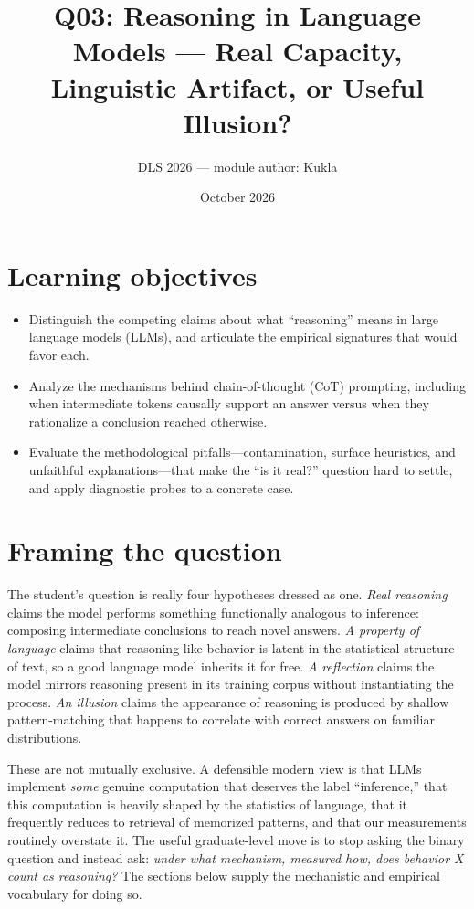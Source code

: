 \documentclass[11pt]{article}
\title{Q03: Reasoning in Language Models --- Real Capacity, Linguistic Artifact, or Useful Illusion?}
\author{DLS 2026 --- module author: Kukla}
\date{October 2026}
\begin{document}
\maketitle

\section*{Learning objectives}
\begin{itemize}[leftmargin=*]
  \item Distinguish the competing claims about what ``reasoning'' means in large language models (LLMs), and articulate the empirical signatures that would favor each.
  \item Analyze the mechanisms behind chain-of-thought (CoT) prompting, including when intermediate tokens causally support an answer versus when they rationalize a conclusion reached otherwise.
  \item Evaluate the methodological pitfalls---contamination, surface heuristics, and unfaithful explanations---that make the ``is it real?'' question hard to settle, and apply diagnostic probes to a concrete case.
\end{itemize}

\section{Framing the question}
The student's question is really four hypotheses dressed as one. \emph{Real reasoning} claims the model performs something functionally analogous to inference: composing intermediate conclusions to reach novel answers. \emph{A property of language} claims that reasoning-like behavior is latent in the statistical structure of text, so a good language model inherits it for free. \emph{A reflection} claims the model mirrors reasoning present in its training corpus without instantiating the process. \emph{An illusion} claims the appearance of reasoning is produced by shallow pattern-matching that happens to correlate with correct answers on familiar distributions.

These are not mutually exclusive. A defensible modern view is that LLMs implement \emph{some} genuine computation that deserves the label ``inference,'' that this computation is heavily shaped by the statistics of language, that it frequently reduces to retrieval of memorized patterns, and that our measurements routinely overstate it. The useful graduate-level move is to stop asking the binary question and instead ask: \emph{under what mechanism, measured how, does behavior X count as reasoning?} The sections below supply the mechanistic and empirical vocabulary for doing so.
\end{document}
